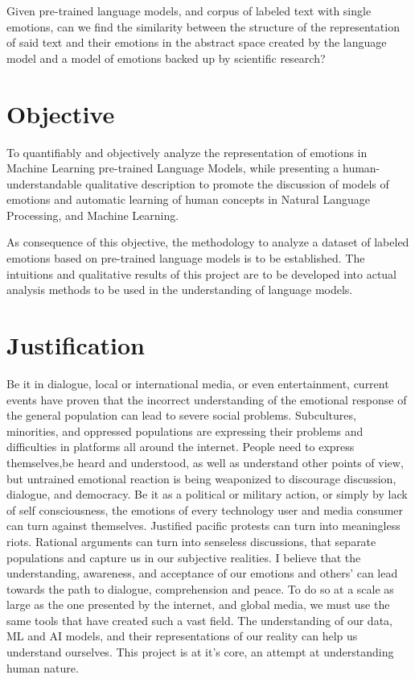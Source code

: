 Given pre-trained language models, and corpus of labeled text with single emotions, can we find the similarity between the structure of the representation of said text and their emotions in the abstract space created by the language model and a model of emotions backed up by scientific research?

\section{Objective}\label{sec:Objective}

To quantifiably and objectively analyze the representation of emotions in Machine Learning pre-trained Language Models, while presenting a human-understandable qualitative description to promote the discussion of models of emotions and automatic learning of human concepts in Natural Language Processing, and Machine Learning.

As consequence of this objective, the methodology to analyze a dataset of labeled emotions based on pre-trained language models is to be established. The intuitions and qualitative results of this project are to be developed into actual analysis methods to be used in the understanding of language models.


\section{Justification}\label{sec:Justification}
Be it in dialogue, local or international media, or even entertainment, current events have proven that the incorrect understanding of the emotional response of the general population can lead to severe social problems. Subcultures, minorities, and oppressed populations are expressing their problems and difficulties in platforms all around the internet. People need to express themselves,be heard and understood, as well as understand other points of view, but untrained emotional reaction is being weaponized to discourage discussion, dialogue, and democracy. Be it as a political or military action, or simply by lack of self consciousness, the emotions of every technology user and media consumer can turn against themselves. Justified pacific protests can turn into meaningless riots. Rational arguments can turn into senseless discussions, that separate populations and capture us in our subjective realities. I believe that the understanding, awareness, and acceptance of our emotions and others' can lead towards the path to dialogue, comprehension and peace. To do so at a scale as large as the one presented by the internet, and global media, we must use the same tools that have created such a vast field. The understanding of our data, ML and AI models, and their representations of our reality can help us understand ourselves. This project is at it's core, an attempt at understanding human nature.
